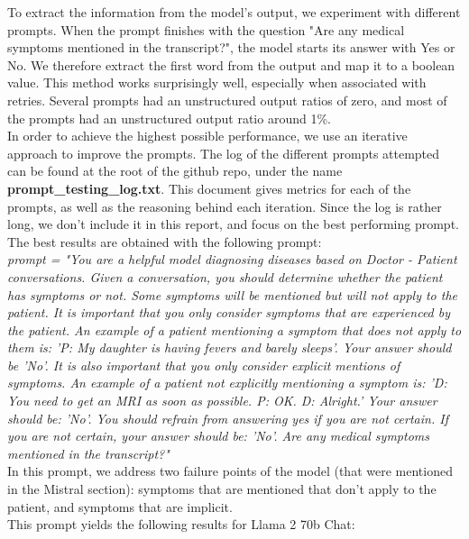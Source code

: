 \documentclass[11pt]{article}
\begin{document}
To extract the information from the model's output, we experiment with different prompts. When the prompt finishes with the question "Are any medical symptoms mentioned in the transcript?", the model starts its answer with Yes or No. We therefore extract the first word from the output and map it to a boolean value. This method works surprisingly well, especially when associated with retries. Several prompts had an unstructured output ratios of zero, and most of the prompts had an unstructured output ratio around 1\%.\\

In order to achieve the highest possible performance, we use an iterative approach to improve the prompts. The log of the different prompts attempted can be found at the root of the github repo, under the name \textbf{prompt\_testing\_log.txt}. This document gives metrics for each of the prompts, as well as the reasoning behind each iteration. Since the log is rather long, we don't include it in this report, and focus on the best performing prompt.\\

The best results are obtained with the following prompt:\\

\textit{prompt = "You are a helpful model diagnosing diseases based on Doctor - Patient conversations. Given a conversation, you should determine whether the patient has symptoms or not. Some symptoms will be mentioned but will not apply to the patient. It is important that you only consider symptoms that are experienced by the patient. An example of a patient mentioning a symptom that does not apply to them is: 'P: My daughter is having fevers and barely sleeps'. Your answer should be 'No'. It is also important that you only consider explicit mentions of symptoms. An example of a patient not explicitly mentioning a symptom is: 'D: You need to get an MRI as soon as possible. P: OK. D: Alright.' Your answer should be: 'No'. You should refrain from answering yes if you are not certain. If you are not certain, your answer should be: 'No'. Are any medical symptoms mentioned in the transcript?"}\\

In this prompt, we address two failure points of the model (that were mentioned in the Mistral section): symptoms that are mentioned that don't apply to the patient, and symptoms that are implicit.\\

This prompt yields the following results for Llama 2 70b Chat:\\
\end{document}
